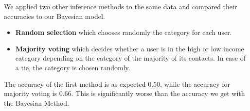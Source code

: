 We applied two other inference methods to the same data and compared their accuracies to our Bayesian model.

\begin{itemize}
	\item \textbf{Random selection} which chooses randomly the category for each user.
	\item \textbf{Majority voting} which decides whether a user is in the high or low income category depending on the category of the majority of its contacts. In case of a tie, the category is chosen randomly.
\end{itemize}

The accuracy of the first method is as expected \num{0.50}, while the accuracy for majority voting is \num{0.66}. This is significantly worse than the accuracy we get with the Bayesian Method.
